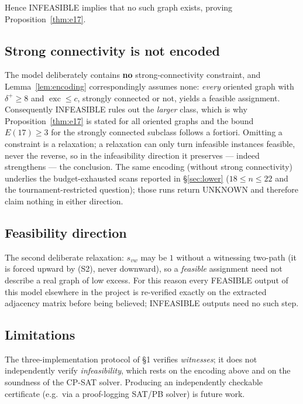 \documentclass[11pt]{amsart}
\theoremstyle{remark}
\newcommand{\exc}{\operatorname{exc}}
\begin{document}
Hence INFEASIBLE implies that no such graph exists, proving
Proposition~\ref{thm:e17}.

\subsection*{Strong connectivity is not encoded}
The model deliberately contains \textbf{no} strong-connectivity
constraint, and Lemma~\ref{lem:encoding} correspondingly assumes none:
\emph{every} oriented graph with $\delta^+ \ge 8$ and $\exc \le c$,
strongly connected or not, yields a feasible assignment.
Consequently INFEASIBLE rules out the \emph{larger} class, which is why
Proposition~\ref{thm:e17} is stated for all oriented graphs and the bound
$E(17) \ge 3$ for the strongly connected subclass follows a fortiori.
Omitting a constraint is a relaxation; a relaxation can only turn
infeasible instances feasible, never the reverse, so in the infeasibility
direction it preserves --- indeed strengthens --- the conclusion. The same
encoding (without strong connectivity) underlies the budget-exhausted
scans reported in \S\ref{sec:lower} ($18 \le n \le 22$ and the
tournament-restricted question); those runs return UNKNOWN and therefore
claim nothing in either direction.

\subsection*{Feasibility direction}
The second deliberate relaxation: $s_{vw}$ may be $1$ without a witnessing
two-path (it is forced upward by (S2), never downward), so a
\emph{feasible} assignment need not describe a real graph of low excess. For this reason every FEASIBLE output of this
model elsewhere in the project is re-verified exactly on the extracted
adjacency matrix before being believed; INFEASIBLE outputs need no such
step.

\subsection*{Limitations}
The three-implementation protocol of \S1 verifies \emph{witnesses}; it
does not independently verify \emph{infeasibility}, which rests on the
encoding above and on the soundness of the CP-SAT solver. Producing an
independently checkable certificate (e.g.\ via a proof-logging SAT/PB
solver) is future work.



\end{document}
